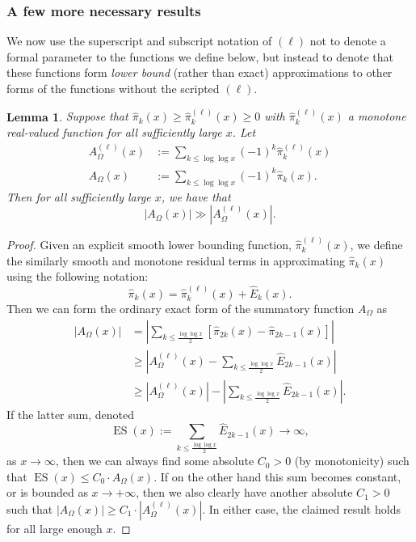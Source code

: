 \documentclass[11pt,reqno,a4letter]{article}
\numberwithin{figure}{section}
\numberwithin{table}{section}
\theoremstyle{plain}
\newtheorem{lemma}[theorem]{Lemma}
\numberwithin{theorem}{section}
\theoremstyle{definition}
\begin{document}
\subsubsection{A few more necessary results} 
\label{subsubSection_RoutineProofsNeededForMainBoundOnGInvxFunc} 

We now use the superscript and subscript notation of 
$(\ell)$ not to denote a formal parameter to 
the functions we define below, but instead to denote that these functions form 
\emph{lower bound} (rather than exact) 
approximations to other forms of the functions without the scripted $(\ell)$. 

\begin{lemma} 
\label{lemma_lowerBoundsOnLambdaFuncParitySummFuncs} 
Suppose that $\widehat{\pi}_k(x) \geq \widehat{\pi}_k^{(\ell)}(x) \geq 0$ 
with $\widehat{\pi}_k^{(\ell)}(x)$ a monotone real-valued function 
for all sufficiently large $x$. 
Let 
\begin{align*} 
A_{\Omega}^{(\ell)}(x) & := \sum_{k \leq \log\log x} (-1)^k \widehat{\pi}_k^{(\ell)}(x) \\ 
A_{\Omega}(x) & := \sum_{k \leq \log\log x} (-1)^k \widehat{\pi}_k(x). 
\end{align*} 
Then for all sufficiently large $x$, we have that 
$$|A_{\Omega}(x)| \gg |A_{\Omega}^{(\ell)}(x)|.$$ 
\end{lemma} 
\begin{proof} 
Given an explicit smooth lower bounding function, $\widehat{\pi}_k^{(\ell)}(x)$, we define the 
similarly smooth and monotone residual terms in approximating $\widehat{\pi}_k(x)$ 
using the following notation: 
\[
\widehat{\pi}_k(x) = \widehat{\pi}_k^{(\ell)}(x) + \widehat{E}_k(x). 
\]
Then we can form the ordinary exact form of the summatory function $A_{\Omega}$ as 
\begin{align*} 
|A_{\Omega}(x)| & = \left\lvert \sum_{k \leq \frac{\log\log x}{2}} 
     \left[\widehat{\pi}_{2k}(x) - \widehat{\pi}_{2k-1}(x)\right] \right\rvert \\ 
     & \geq \left\lvert A_{\Omega}^{(\ell)}(x) - \sum_{k \leq \frac{\log\log x}{2}} \widehat{E}_{2k-1}(x) 
     \right\rvert \\ 
     & \geq 
     \left\lvert A_{\Omega}^{(\ell)}(x) \right\rvert - 
     \left\lvert \sum_{k \leq \frac{\log\log x}{2}} \widehat{E}_{2k-1}(x) 
     \right\rvert. 
\end{align*} 
If the latter sum, denoted 
$$\operatorname{ES}(x) := \sum_{k \leq \frac{\log\log x}{2}} \widehat{E}_{2k-1}(x) \rightarrow \infty,$$ as 
$x \rightarrow \infty$, then we can always find some absolute $C_0 > 0$ (by monotonicity) such that 
$\operatorname{ES}(x) \leq C_0 \cdot A_{\Omega}(x)$. If on the other hand this sum becomes constant, or is bounded 
as $x \rightarrow +\infty$, then we also clearly have another absolute $C_1 > 0$ such that 
$|A_{\Omega}(x)| \geq C_1 \cdot |A_{\Omega}^{(\ell)}(x)|$. 
In either case, the claimed result holds for all large enough $x$. 
\end{proof} 
\end{document}

